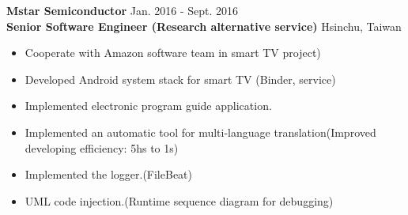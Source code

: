 \documentclass{res}
\begin{document}
\begin{resume}
{%
				{\hfill{\bf Mstar Semiconductor}\hspace{3.5cm} Jan. 2016 - Sept. 2016}\\
				{\bf Senior Software Engineer (Research alternative service) }		 {\hfill Hsinchu, Taiwan}
				\begin{itemize}
					\item Cooperate with Amazon software team in smart TV project)
					\vspace{-0.05in}
					\item Developed Android system stack for smart TV (Binder, service)
					\vspace{-0.05in}
					\item Implemented electronic program guide application.
					\vspace{-0.05in}
					\item Implemented an automatic tool for multi-language translation(Improved developing efficiency: 5hs to 1s)
					\vspace{-0.05in}
					\item Implemented the logger.(FileBeat)
					\vspace{-0.05in}
					\item UML code injection.(Runtime sequence diagram for debugging)
				\end{itemize}
				\vspace{-0.10in}




}
\end{resume}
\end{document}
